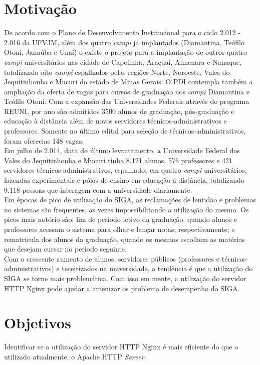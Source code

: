 \section{Motivação}
De acordo com o Plano de Desenvolvimento Institucional para o ciclo 2.012 - 
2.016 da UFVJM, além dos quatro \textit{campi} já implantados (Diamantina, 
Teófilo Otoni, Janaúba e Unaí) o existe o projeto para a implantação de outros 
quatro \textit{campi} universitários nas cidade de Capelinha, Araçuaí, Almenara 
e Nanuque, totalizando oito \textit{campi} espalhados pelas regiões Norte, 
Noroeste, Vales do Jequitinhonha e Mucuri do estado de Minas Gerais. O 
PDI 
contempla também a ampliação da oferta de vagas para cursos de graduação nos 
\textit{campi} Diamantina e Teófilo Otoni.
Com a expansão das Universidades Federais através do programa REUNI, por ano 
são admitidos 3500 alunos de graduação, pós-graduação e educação à distância 
além de novos servidores técnicos-administrativos e professores. Somente no 
último edital para seleção de técnicos-administrativos, foram oferecias 148 
vagas.\\
Em julho de 2.014, data do último levantamento, a Universidade Federal dos 
Vales do Jequitinhonha e Mucuri tinha 8.121 alunos, 576 professores e 421 
servidores técnicos-administrativos, espalhados em quatro \textit{campi} 
universitários, fazendas experimentais e pólos de ensino em educação à 
distância, totalizando 9.118 pessoas que interagem com a universidade 
diariamente.\\
Em épocas de pico de utilização do SIGA, as reclamações de lentidão e problemas 
no sistemas são frequentes, as vezes impossibilitando a utilização do mesmo. Os 
picos mais notório são: fim de período letivo da graduação, quando alunos e 
professores acessam o sistema para olhar e lançar notas, respectivamente; e 
rematricula dos alunos da graduação, quando os mesmos escolhem as matérias que 
desejam cursar no período seguinte.\\
Com o crescente aumento de alunos, servidores públicos (professores e técnicos-administrativos) e teceirizados na universidade, a tendência é que a utilização do SIGA se torne mais problemática.
Com isso em mente, a utilização do servidor HTTP Nginx pode ajudar a amenizar 
os problema de desempenho do SIGA.\\
\section{Objetivos}
Identificar se a utilização do servidor HTTP Nginx é mais eficiente do que o 
utilizado atualmente, o Apache HTTP \textit{Server}.\\
